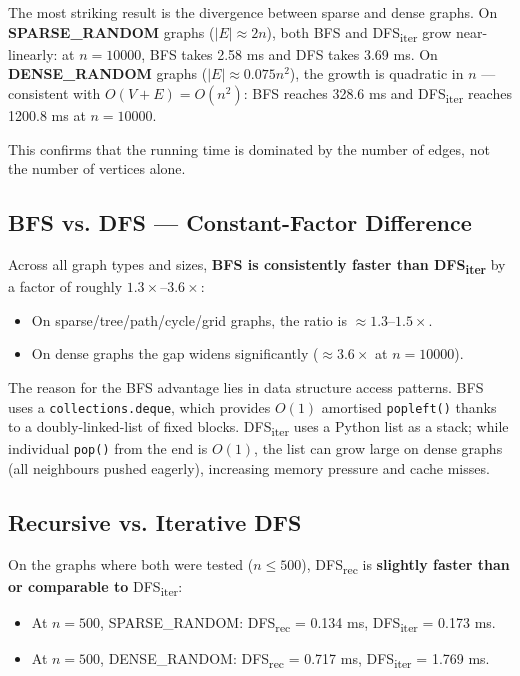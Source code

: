 The most striking result is the divergence between sparse and dense graphs. On \textbf{SPARSE\_RANDOM} graphs ($|E| \approx 2n$), both BFS and DFS\textsubscript{iter} grow near-linearly: at $n = 10000$, BFS takes 2.58 ms and DFS takes 3.69 ms. On \textbf{DENSE\_RANDOM} graphs ($|E| \approx 0.075 n^2$), the growth is quadratic in $n$ — consistent with $O(V + E) = O(n^2)$: BFS reaches 328.6 ms and DFS\textsubscript{iter} reaches 1200.8 ms at $n = 10000$.

This confirms that the running time is dominated by the number of edges, not the number of vertices alone.

\subsection{BFS vs. DFS — Constant-Factor Difference}

Across all graph types and sizes, \textbf{BFS is consistently faster than DFS\textsubscript{iter}} by a factor of roughly $1.3\times$–$3.6\times$:
\begin{itemize}
    \item On sparse/tree/path/cycle/grid graphs, the ratio is $\approx 1.3$–$1.5\times$.
    \item On dense graphs the gap widens significantly ($\approx 3.6\times$ at $n = 10000$).
\end{itemize}

The reason for the BFS advantage lies in data structure access patterns. BFS uses a \texttt{collections.deque}, which provides $O(1)$ amortised \texttt{popleft()} thanks to a doubly-linked-list of fixed blocks. DFS\textsubscript{iter} uses a Python list as a stack; while individual \texttt{pop()} from the end is $O(1)$, the list can grow large on dense graphs (all neighbours pushed eagerly), increasing memory pressure and cache misses.

\subsection{Recursive vs. Iterative DFS}

On the graphs where both were tested ($n \leq 500$), DFS\textsubscript{rec} is \textbf{slightly faster than or comparable to} DFS\textsubscript{iter}:
\begin{itemize}
    \item At $n = 500$, SPARSE\_RANDOM: DFS\textsubscript{rec} = 0.134 ms, DFS\textsubscript{iter} = 0.173 ms.
    \item At $n = 500$, DENSE\_RANDOM: DFS\textsubscript{rec} = 0.717 ms, DFS\textsubscript{iter} = 1.769 ms.
\end{itemize}

